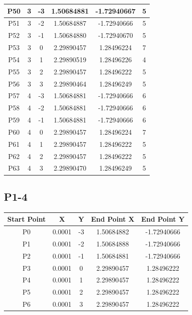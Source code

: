 \documentclass[a4paper,12pt]{article}
\begin{document}
\begin{longtable}{|c|c|c|c|c|c|}
    \hline
    P50 & 3 & -3 & 1.50684881 & -1.72940667 & 5 \\ 
    \hline
    P51 & 3 & -2 & 1.50684887 & -1.72940666 & 5 \\ 
    \hline
    P52 & 3 & -1 & 1.50684880 & -1.72940670 & 5 \\ 
    \hline
    P53 & 3 & 0 & 2.29890457 & 1.28496224 & 7 \\ 
    \hline
    P54 & 3 & 1 & 2.29890519 & 1.28496226 & 4 \\ 
    \hline
    P55 & 3 & 2 & 2.29890457 & 1.28496222 & 5 \\ 
    \hline
    P56 & 3 & 3 & 2.29890464 & 1.28496249 & 5 \\ 
    \hline
    P57 & 4 & -3 & 1.50684881 & -1.72940666 & 6 \\ 
    \hline
    P58 & 4 & -2 & 1.50684881 & -1.72940666 & 6 \\ 
    \hline
    P59 & 4 & -1 & 1.50684881 & -1.72940666 & 6 \\ 
    \hline
    P60 & 4 & 0 & 2.29890457 & 1.28496224 & 7 \\ 
    \hline
    P61 & 4 & 1 & 2.29890457 & 1.28496222 & 5 \\ 
    \hline
    P62 & 4 & 2 & 2.29890457 & 1.28496222 & 5 \\ 
    \hline
    P63 & 4 & 3 & 2.29890470 & 1.28496249 & 5 \\ 
    \hline

\end{longtable}

\subsection{P1-4}
\begin{longtable}{|c|c|c|c|c|}
    \hline
    Start Point & X & Y &  End Point X & End Point Y\\
    \hline
    P0 & 0.0001 & -3 & 1.50684882 & -1.72940666 \\ 
    \hline
    P1 & 0.0001 & -2 & 1.50684888 & -1.72940666 \\ 
    \hline
    P2 & 0.0001 & -1 & 1.50684881 & -1.72940666 \\ 
    \hline
    P3 & 0.0001 & 0 & 2.29890457 & 1.28496222 \\ 
    \hline
    P4 & 0.0001 & 1 & 2.29890457 & 1.28496222 \\ 
    \hline
    P5 & 0.0001 & 2 & 2.29890457 & 1.28496222 \\ 
    \hline
    P6 & 0.0001 & 3 & 2.29890457 & 1.28496222 \\ 
    \hline    
\end{longtable}
\end{document}
